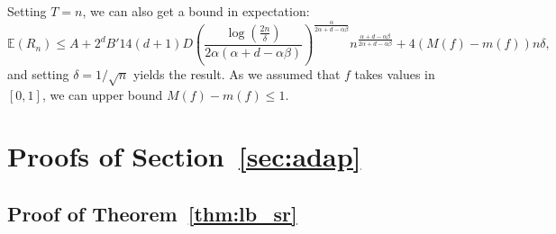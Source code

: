 \documentclass[final,12pt]{colt2018}
\begin{document}
Setting $T = n$, we can also get a bound in expectation:
$$
\mathbb{E}(R_n) \leq A + 2^d B' 14(d+1)D \left(\frac{\log(\frac{2n}{\delta})}{2\alpha(\alpha + d -\alpha\beta)}\right)^{\frac{\alpha}{2\alpha+d-\alpha\beta}}n^{\frac{\alpha+d-\alpha\beta}{2\alpha+d-\alpha\beta}} + 4 (M(f)- m(f))n \delta,
$$
and setting $\delta = 1/\sqrt{n}$ yields the result. As we assumed that $f$ takes values in $[0,1]$, we can upper bound $M(f) - m(f) \leq 1$.

\section{Proofs of Section~\ref{sec:adap}}
\subsection{Proof of Theorem~\ref{thm:lb_sr}}\label{proof:sr}
\end{document}
